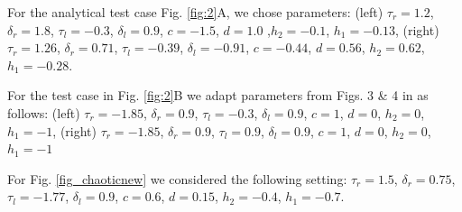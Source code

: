 \documentclass{article}
\theoremstyle{example}
\theoremstyle{plain}
\theoremstyle{definition}
\theoremstyle{remark}
\begin{document}
For the analytical test case Fig. \ref{fig:2}A, we chose parameters:
(left) $
\tau_r =1.2$, $\delta_r = 1.8$, $\tau_l = -0.3$, $\delta_l = 0.9$,  $c = -1.5$,  $d = 1.0$ ,$h_2 = -0.1$,  $h_1 = -0.13$, 
(right) 
$\tau_r = 1.26$, $\delta_r = 0.71$, $\tau_l = -0.39$, $\delta_l = -0.91$,  $c = -0.44$,  $d = 0.56$,  $h_2 = 0.62$,  $h_1 = -0.28$.


For the test case in Fig. \ref{fig:2}B we adapt parameters from Figs. 3 \& 4 in \cite{gardini2009connection} as follows: (left) $\tau_r = -1.85$, $\delta_r = 0.9$, $\tau_l = -0.3$, $\delta_l = 0.9$,  $c = 1$,  $d = 0$,  $h_2 = 0$,  $h_1 = -1$, (right) $
\tau_r = -1.85$, $\delta_r = 0.9$, $\tau_l = 0.9$, $\delta_l = 0.9$,  $c = 1$,  $d = 0$,  $h_2 = 0$,  $h_1 = -1$

For Fig. \ref{fig_chaoticnew} we considered the following setting: $\tau_r=1.5$,  $\delta_r=0.75$, $\tau_l=-1.77$, $\delta_l=0.9$, $c=0.6$, $d=0.15$, $h_2=-0.4$, $h_1=-0.7$.   
\end{document}
